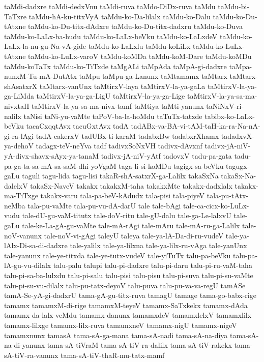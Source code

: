 {taMdi-dadxre
taMdi-dedxVnu
taMdi-ruva
taMdo-DiDx-ruva
taMdu
taMdu-bi-TaTxre
taMdu-hA-ku-titxVyA
taMdu-ko-Da-lilalx
taMdu-ko-Dalu
taMdu-ko-Du-tAtxne
taMdu-ko-Du-titx-dAdxre
taMdu-ko-Du-titx-dadxru
taMdu-ko-Duva
taMdu-ko-LaLx-ba-hudu
taMdu-ko-LaLx-beVku
taMdu-ko-LaLxdeV
taMdu-ko-LaLx-la-nu-gu-Na-vA-gide
taMdu-ko-LaLxlu
taMdu-koLiLx
taMdu-ko-LuLx-tAtxne
taMdu-ko-LuLx-varoV
taMdu-koMDa
taMdu-koM-Dare
taMdu-koMDu
taMdu-koTaTx
taMdu-ko-TiTxde
taMgALi
taMpAda
taMpA-gi-dadxre
taMpa-nunxM-Tu-mA-DutAtx
taMpu
taMpu-ga-Lanunx
taMtamamx
taMtarx
taMtarx-shAsatxrX
taMtarx-vanUnx
taMtirxV-laya
taMtirxV-la-ya-gaLa
taMtirxV-la-ya-ga-LiMda
taMtirxV-la-ya-ga-LigU
taMtirxV-la-ya-ga-Lige
taMtirxV-la-ya-sa-ma-nivxtaH
taMtirxV-la-ya-sa-ma-nivx-tamf
taMtiya
taMti-yanunx
taNiNxV-ri-nalilx
taNisi
taNi-yu-vaMte
taPoV-ba-la-hoMdu
taTuTx-tatxde
tabibx-ko-LaLx-beVku
tacaCxqqtAvx
tacuGxtAvx
tadA
tadABx-va-BA-vi-tAM-taH-ka-ra-Na-nA-gi-ra-lAgi
tadA-cakerxV
tadUBx-ti-karaM
tadabxBw
tadabxrXhamx
tadadxvX-ya-dehoV
tadagx-teV-neYva
tadf
tadivxSoNxVH
tadivx-dAvxnf
tadivx-jA-niV-yA-divx-shavx-sAyx-ya-tanaM
tadivx-jA-niV-yAtf
tadovxV
tadu-pa-gata
tadu-pa-ga-ta-sa-mA-sa-saM-dhi-yoVgaM
taga-li-si-koMDu
tagigx-sa-beVku
tagugx-gaLu
taguli
tagu-lida
tagu-lisi
takaR-shA-satxrX-ga-Lalilx
takaSxNa
takaSx-Na-dalelxV
takaSx-NaveV
takakx
takakxM-taha
takakxMte
takakx-dadxlalx
takakx-ma-TiTxge
takakx-varu
tala-pa-beV-kAdudx
tala-pisi
tala-piyeV
tala-pu-tAtx-neMba
tala-pu-vaMte
tala-pu-vu-dA-darU
tale
tale-bAgi
tale-ca-cicx-ko-LuLx-vudu
tale-dU-gu-vaM-titutx
tale-doV-ritu
tale-gU-dalu
tale-ga-Le-lalxvU
tale-gaLu
tale-ke-La-gA-gu-vaMte
tale-mA-rAgi
tale-mAru
tale-mA-ru-ga-Lalilx
tale-noV-vanunx
tale-noV-vi-gAgi
taleyU
taleya
tale-ya-lA-Da-di-ru-vudeV
tale-ya-lAlx-Di-sa-di-dadxre
tale-yalilx
tale-ya-lilxna
tale-ya-lilx-ru-vAga
tale-yanUnx
tale-yanunx
tale-ye-titxda
tale-ye-tutx-vudeV
tale-yiTuTx
talu-pa-beVku
talu-pa-lA-gu-vu-dilalx
talu-palu
talupi
talu-pi-dadxre
talu-pi-daru
talu-pi-ru-vaM-taha
talu-pi-sa-ba-lulxdu
talu-pi-salu
talu-pisi
talu-pisu
talu-pi-suva
talu-pi-su-vaMte
talu-pi-su-vu-dilalx
talu-pu-tatx-deyoV
talu-puva
talu-pu-va-va-regU
tamASe
tamA-Se-yA-gi-dadxrU
tama-gA-gu-titx-ruva
tamagU
tamage
tama-go-babx-rige
tamamx
tamamxM-di-rige
tamamxM-teyeV
tamamx-SaTxkekx
tamamx-dAda
tamamx-da-lalx-veMdu
tamamx-danunx
tamamxdeV
tamamxlelxV
tamamxlilx
tamamx-lilxge
tamamx-lilx-ruva
tamamxneV
tamamx-nigU
tamamx-nigeV
tamamxnunx
tamasA
tama-sA-ga-mana
tama-sA-nadi
tama-sA-na-diya
tama-sA-na-di-yanunx
tama-sA-tiVraM
tama-sA-tiV-ra-dalilx
tama-sA-tiV-rakekx
tama-sA-tiV-ra-vanunx
tama-sA-tiV-thaR-mu-tatx-mamf
}
